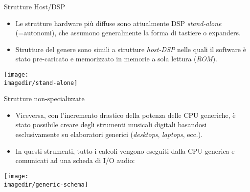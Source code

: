 \begin{slide}{Strutture Host/DSP}
{

	\begin{itemize}

		\item Le strutture hardware pi\`u diffuse sono
              attualmente DSP \emph{stand-alone}
              (=autonomi), che assumono generalmente
              la forma di tastiere o expanders.

		\item Strutture del genere sono simili a strutture
              \emph{host-DSP} nelle quali
              il software \`e stato pre-caricato
              e memorizzato in memorie a sola lettura (\emph{ROM}).

	\end{itemize}

	\begin{center}
		\texttt{[image: \\imagedir/stand-alone]}
	\end{center}

}
\end{slide}

\begin{slide}{Strutture non-specializzate}
{

	\begin{itemize}

		\item Viceversa, con l'incremento drastico della potenza
		      delle CPU generiche, \`e stato possibile creare
              degli strumenti musicali digitali
              basandosi esclusivamente su elaboratori
              generici (\emph{desktops}, \emph{laptops}, ecc.).

		\item In questi strumenti, tutto i calcoli vengono eseguiti
		      dalla CPU generica e comunicati ad una scheda di I/O audio:

	\end{itemize}

	\begin{center}
		\texttt{[image: \\imagedir/generic-schema]}
	\end{center}

}
\end{slide}
